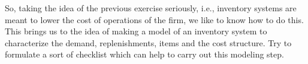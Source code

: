 \begin{exercise}
  So, taking the idea of the previous exercise seriously, i.e.,
  inventory systems are meant to lower the cost of operations of the
  firm, we like to know how to do this. This brings us to the idea of
  making a model of an inventory system to characterize the demand,
  replenishments, items and the cost structure. Try to formulate a
  sort of checklist which can help to carry out this modeling step.

\end{exercise}
